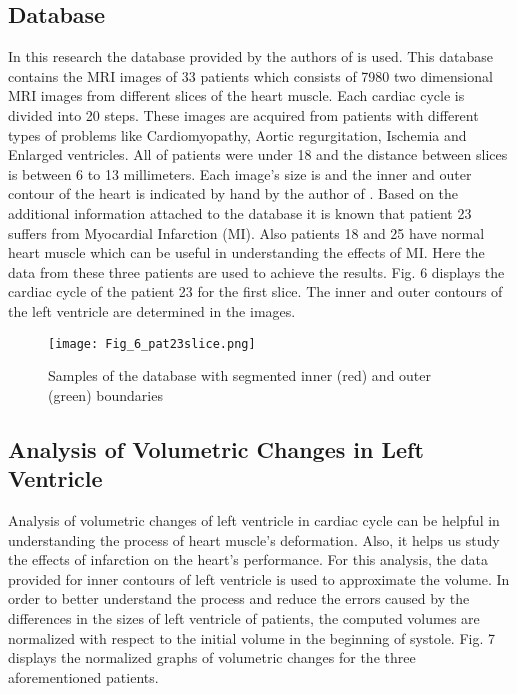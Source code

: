 \documentclass{jicspack}
\begin{document}
\subsection{Database}

In this research the database provided by the authors of \cite{23} is used. This database
contains the MRI images of 33 patients which consists of 7980 two dimensional MRI images
from different slices of the heart muscle. Each cardiac cycle is divided into 20 steps. These
images are acquired from patients with different types of problems like Cardiomyopathy,
Aortic regurgitation, Ischemia and Enlarged ventricles. All of patients were under 18 and the
distance between slices is between 6 to 13 millimeters. Each image's size is  and the
inner and outer contour of the heart is indicated by hand by the author of \cite{23}. Based on the
additional information attached to the database it is known that patient 23 suffers from
Myocardial Infarction (MI). Also patients 18 and 25 have normal heart muscle which can be useful in understanding the effects of MI. Here the data from these three patients are used
to achieve the results. Fig. 6 displays the cardiac cycle of the patient 23 for the first slice. The inner and outer contours of the left ventricle are determined in the images. 

\begin{figure}
\centering
\texttt{[image: Fig\_6\_pat23slice.png]}
\caption{Samples of the database with segmented inner (red) and outer (green) boundaries}
\end{figure}

\subsection{Analysis of Volumetric Changes in Left Ventricle}

Analysis of volumetric changes of left ventricle in cardiac cycle can be helpful in
understanding the process of heart muscle's deformation. Also, it helps us study the effects of infarction on the heart's performance.
For this analysis, the data provided for inner contours of left ventricle is used to approximate
the volume. In order to better understand the process and reduce the errors caused
by the differences in the sizes of left ventricle of patients, the computed volumes are normalized with
respect to the initial volume in the beginning of systole. Fig. 7 displays the
normalized graphs of volumetric changes for the three aforementioned patients. 
\end{document}
